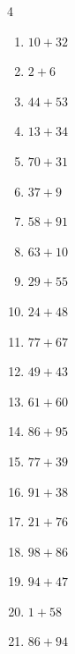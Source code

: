 \begin{multicols}{4}
\begin{enumerate}
  \item $10+32$
        \phantom{$=42$}

  \item $2+6$
        \phantom{$=8$}

  \item $44+53$
        \phantom{$=97$}

  \item $13+34$
        \phantom{$=47$}

  \item $70+31$
        \phantom{$=101$}

  \item $37+9$
        \phantom{$=46$}

  \item $58+91$
        \phantom{$=149$}

  \item $63+10$
        \phantom{$=73$}

  \item $29+55$
        \phantom{$=84$}

  \item $24+48$
        \phantom{$=72$}

  \item $77+67$
        \phantom{$=144$}

  \item $49+43$
        \phantom{$=92$}

  \item $61+60$
        \phantom{$=121$}

  \item $86+95$
        \phantom{$=181$}

  \item $77+39$
        \phantom{$=116$}

  \item $91+38$
        \phantom{$=129$}

\columnbreak %

\resetques

  \item $21+76$
        \phantom{$=97$}

  \item $98+86$
        \phantom{$=184$}

  \item $94+47$
        \phantom{$=141$}

  \item $1+58$
        \phantom{$=59$}

  \item $86+94$
        \phantom{$=180$}


\end{enumerate}
\end{multicols}
